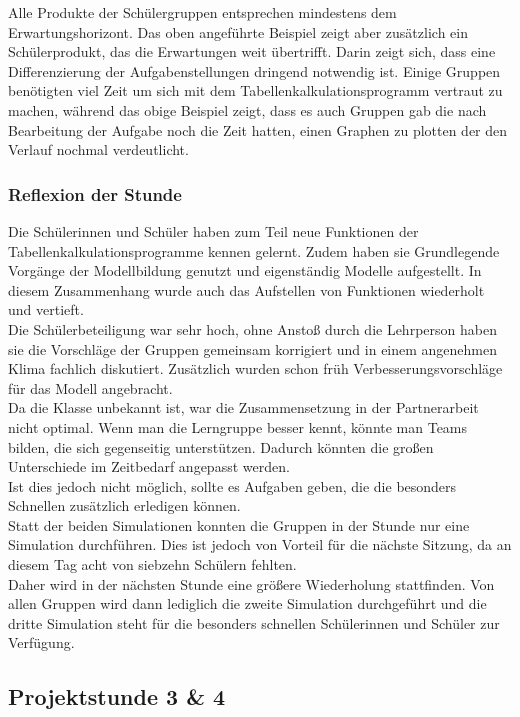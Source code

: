 Alle Produkte der Schülergruppen entsprechen mindestens dem Erwartungshorizont. Das oben angeführte Beispiel zeigt aber zusätzlich ein Schülerprodukt, das die Erwartungen weit übertrifft. Darin zeigt sich, dass eine Differenzierung der Aufgabenstellungen dringend notwendig ist. Einige Gruppen benötigten viel Zeit um sich mit dem Tabellenkalkulationsprogramm vertraut zu machen, während das obige Beispiel zeigt, dass es auch Gruppen gab die nach Bearbeitung der Aufgabe noch die Zeit hatten, einen Graphen zu plotten der den Verlauf nochmal verdeutlicht.  

\subsubsection*{Reflexion der Stunde}
Die Schülerinnen und Schüler haben zum Teil neue Funktionen der Tabellenkalkulationsprogramme kennen gelernt. Zudem haben sie Grundlegende Vorgänge der Modellbildung genutzt und eigenständig Modelle aufgestellt. In diesem Zusammenhang wurde auch das Aufstellen von Funktionen wiederholt und vertieft.\\
Die Schülerbeteiligung war sehr hoch, ohne Anstoß durch die Lehrperson haben sie die Vorschläge der Gruppen gemeinsam korrigiert und in einem angenehmen Klima fachlich diskutiert. Zusätzlich wurden schon früh Verbesserungsvorschläge für das Modell angebracht.\\
Da die Klasse unbekannt ist, war die Zusammensetzung in der Partnerarbeit nicht optimal. Wenn man die Lerngruppe besser kennt, könnte man Teams bilden, die sich gegenseitig unterstützen. Dadurch könnten die großen Unterschiede im Zeitbedarf angepasst werden.\\
Ist dies jedoch nicht möglich, sollte es Aufgaben geben, die die besonders Schnellen zusätzlich erledigen können.\\
Statt der beiden Simulationen konnten die Gruppen in der Stunde nur eine Simulation durchführen. Dies ist jedoch von Vorteil für die nächste Sitzung, da an diesem Tag acht von siebzehn Schülern fehlten.\\
Daher wird in der nächsten Stunde eine größere Wiederholung stattfinden. Von allen Gruppen wird dann lediglich die zweite Simulation durchgeführt und die dritte Simulation steht für die besonders schnellen Schülerinnen und Schüler zur Verfügung. 
\newpage
\subsection{Projektstunde 3 \& 4}\ellen
